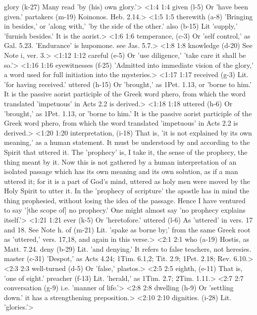   glory (k-27)  Many read 'by (his) own glory.'>
<1:4 1:4  given (l-5)  Or 'have been given.'
  partakers (m-19)  Koinonos. Heb. 2.14.>
<1:5 1:5  therewith (a-8)  'Bringing in besides,' or 'along with,' 'by the side of the  other.'
  also (b-15)  Lit 'supply,' 'furnish besides.' It is the aorist.>
<1:6 1:6  temperance, (c-3)  Or 'self control,' as Gal. 5.23. 'Endurance' is hupomone.  see Jas. 5.7.>
<1:8 1:8  knowledge (d-20)  See Note i, ver. 3.>
<1:12 1:12  careful (e-5)  Or 'use diligence,' 'take care it shall be so.'>
<1:16 1:16  eyewitnesses (f-25)  'Admitted into immediate vision of the glory,' a word used  for full initiation into the mysteries.>
<1:17 1:17  received (g-3)  Lit. 'for having received.'
  uttered (h-15)  Or 'brought,' as 1Pet. 1.13, or 'borne to him.' It is the  passive aorist participle of the Greek word phero, from which  the word translated 'impetuous' in Acts 2.2 is derived.>
<1:18 1:18  uttered (h-6)  Or 'brought,' as 1Pet. 1.13, or 'borne to him.' It is the  passive aorist participle of the Greek word phero, from which  the word translated 'impetuous' in Acts 2.2 is derived.>
<1:20 1:20  interpretation, (i-18)  That is, 'it is not explained by its own meaning,' as a human  statement. It must be understood by and according to the Spirit  that uttered it. The 'prophecy' is, I take it, the sense of the  prophecy, the thing meant by it. Now this is not gathered by a  human interpretation of an isolated passage which has its own  meaning and its own solution, as if a man uttered it; for it is  a part of God's mind, uttered as holy men were moved by the  Holy Spirit to utter it. In the 'prophecy of scripture' the  apostle has in mind the thing prophesied, without losing the  idea of the passage. Hence I have ventured to say '[the scope  of] no prophecy.' One might almost say 'no prophecy explains  itself.'>
<1:21 1:21  ever (k-5)  Or 'heretofore.'
  uttered (l-6)  As 'uttered' in vers. 17 and 18. See Note h.
  of (m-21)  Lit. 'spake as borne by;' from the same Greek root as  'uttered,' vers. 17,18, and again in this verse.>
<2:1 2:1  who (a-19)  Hostis, as Matt. 7.24.
  deny (b-29)  Lit. 'and denying.' It refers to false teachers, not  heresies.
  master (c-31)  'Despot,' as Acts 4.24; 1Tim. 6.1,2; Tit. 2.9; 1Pet. 2.18;  Rev. 6.10.>
<2:3 2:3  well-turned (d-5)  Or 'false,' plastos.>
<2:5 2:5  eighth, (e-11)  That is, 'one of eight.'
  preacher (f-13)  Lit. 'herald,' as 1Tim. 2.7; 2Tim. 1.11.>
<2:7 2:7  conversation (g-9)  i.e. 'manner of life.'>
<2:8 2:8  dwelling (h-9)  Or 'settling down.' it has a strengthening preposition.>
<2:10 2:10  dignities. (i-28)  Lit. 'glories.'>
